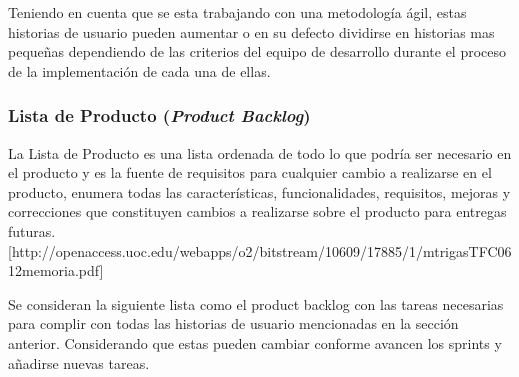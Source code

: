 Teniendo en cuenta que se esta trabajando con una metodología ágil, estas historias de usuario pueden aumentar o en su defecto dividirse en historias mas pequeñas dependiendo de las criterios del equipo de desarrollo durante el proceso de la implementación de cada una de ellas.




\subsubsection{Lista de Producto (\textit{Product Backlog})}
La Lista de Producto es una lista ordenada de todo lo que podría ser necesario en el producto y es la fuente de requisitos para cualquier cambio a realizarse en el producto, enumera todas las características, funcionalidades, requisitos, mejoras y correcciones que constituyen cambios a realizarse sobre el producto para entregas futuras.[http://openaccess.uoc.edu/webapps/o2/bitstream/10609/17885/1/mtrigasTFC0612memoria.pdf]

Se consideran la siguiente lista como el product backlog con las tareas necesarias para complir con todas las historias de usuario mencionadas en la sección anterior.
Considerando que estas pueden cambiar conforme avancen los sprints y añadirse nuevas tareas.

